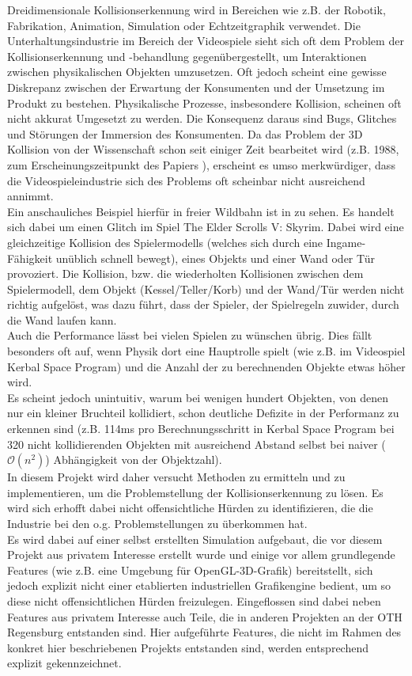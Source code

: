 
Dreidimensionale Kollisionserkennung wird in Bereichen wie z.B. der Robotik, Fabrikation, Animation, Simulation oder Echtzeitgraphik verwendet.
Die Unterhaltungsindustrie im Bereich der Videospiele sieht sich oft dem Problem der Kollisionserkennung und -behandlung gegenübergestellt, um Interaktionen zwischen physikalischen Objekten umzusetzen.
Oft jedoch scheint eine gewisse Diskrepanz zwischen der Erwartung der Konsumenten und der Umsetzung im Produkt zu bestehen. Physikalische Prozesse, insbesondere Kollision, scheinen oft nicht akkurat Umgesetzt zu werden. Die Konsequenz daraus sind Bugs, Glitches und Störungen der Immersion des Konsumenten.
Da das Problem der 3D Kollision von der Wissenschaft schon seit einiger Zeit bearbeitet wird (z.B. 1988, zum Erscheinungszeitpunkt des Papiers \cite{gjk}), erscheint es umso merkwürdiger, dass die Videospieleindustrie sich des Problems oft scheinbar nicht ausreichend annimmt.\\
Ein anschauliches Beispiel hierfür in freier Wildbahn ist in \cite{skyrimwallglitch} zu sehen. Es handelt sich dabei um einen Glitch im Spiel The Elder Scrolls V: Skyrim. Dabei wird eine gleichzeitige Kollision des Spielermodells (welches sich durch eine Ingame-Fähigkeit unüblich schnell bewegt), eines Objekts und einer Wand oder Tür provoziert. Die Kollision, bzw. die wiederholten Kollisionen zwischen dem Spielermodell, dem Objekt (Kessel/Teller/Korb) und der Wand/Tür werden nicht richtig aufgelöst, was dazu führt, dass der Spieler, der Spielregeln zuwider, durch die Wand laufen kann.\\
Auch die Performance lässt bei vielen Spielen zu wünschen übrig. Dies fällt besonders oft auf, wenn Physik dort eine Hauptrolle spielt (wie z.B. im Videospiel Kerbal Space Program) und die Anzahl der zu berechnenden Objekte etwas höher wird.\\
Es scheint jedoch unintuitiv, warum bei wenigen hundert Objekten, von denen nur ein kleiner Bruchteil kollidiert, schon deutliche Defizite in der Performanz zu erkennen sind (z.B. 114ms pro Berechnungsschritt in Kerbal Space Program bei 320 nicht kollidierenden Objekten mit ausreichend Abstand selbst bei naiver ($\mathcal{O}(n^2)$) Abhängigkeit von der Objektzahl).\\
In diesem Projekt wird daher versucht Methoden zu ermitteln und zu implementieren, um die Problemstellung der Kollisionserkennung zu lösen. Es wird sich erhofft dabei nicht offensichtliche Hürden zu identifizieren, die die Industrie bei den o.g. Problemstellungen zu überkommen hat. \\
Es wird dabei auf einer selbst erstellten Simulation aufgebaut, die vor diesem Projekt aus privatem Interesse erstellt wurde und einige vor allem grundlegende Features (wie z.B. eine Umgebung für OpenGL-3D-Grafik) bereitstellt, sich jedoch explizit nicht einer etablierten industriellen Grafikengine bedient, um so diese nicht offensichtlichen Hürden freizulegen. 
Eingeflossen sind dabei neben Features aus privatem Interesse auch Teile, die in anderen Projekten an der OTH Regensburg entstanden sind. Hier aufgeführte Features, die nicht im Rahmen des konkret hier beschriebenen Projekts entstanden sind, werden entsprechend explizit gekennzeichnet.